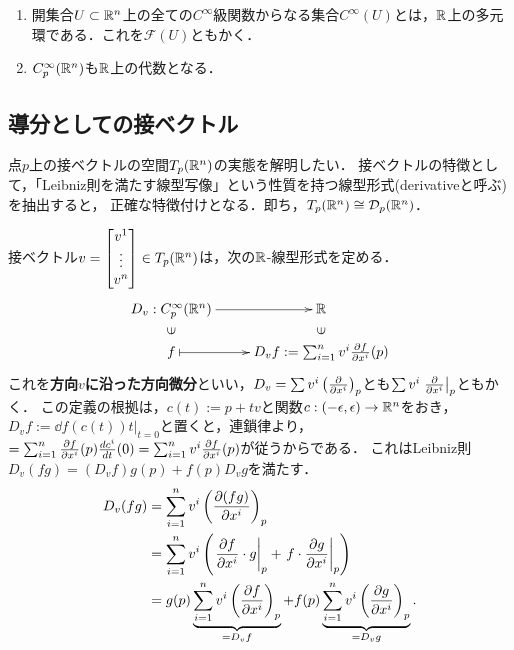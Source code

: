 \documentclass[uplatex,dvipdfmx]{jsreport}
\begin{document}
\begin{example}\mbox{}
    \begin{enumerate}
        \item 開集合$U\subset\mathbb{R}^n$上の全ての$C^\infty$級関数からなる集合$C^\infty(U)$とは，$\mathbb{R}$上の多元環である．これを$\mathcal{F}(U)$ともかく．
        \item $C^\infty_p(\mathbb{R}^n)$も$\mathbb{R}$上の代数となる．
    \end{enumerate}
\end{example}

\subsection{導分としての接ベクトル}

\begin{tcolorbox}[colframe=ForestGreen, colback=ForestGreen!10!white, breakable ,colbacktitle=ForestGreen!40!white, coltitle=black,fonttitle=\bfseries\sffamily,
    title=]
    点$p$上の接ベクトルの空間$T_p(\mathbb{R}^n)$の実態を解明したい．
    接ベクトルの特徴として，「Leibniz則を満たす線型写像」という性質を持つ線型形式(derivativeと呼ぶ)を抽出すると，
    正確な特徴付けとなる．即ち，$T_p(\mathbb{R}^n)\cong\mathcal{D}_p(\mathbb{R}^n)$．
\end{tcolorbox}

\begin{discussion}[方向微分の研究]\label{discussion-tangent-vector-as-differential}
    接ベクトル$v=\begin{bmatrix}v^1\\\vdots\\v^n\end{bmatrix}\in T_p(\mathbb{R}^n)$は，次の$\mathbb{R}$-線型形式を定める．
    \[\xymatrix@R-2pc{
        D_v:C^\infty_p(\R^n)\ar[r]&\R\\
        \rotatebox[origin=c]{90}{$\in$}&\rotatebox[origin=c]{90}{$\in$}\\
        f\ar@{|->}[r]&D_vf:=\sum^n_{i=1}v^i\pp{f}{x^i}(p)
    }\]
    これを\textbf{方向$v$に沿った方向微分}といい，$D_v=\sum v^i\left(\frac{\partial }{\partial x^i}\right)_p$とも$\sum v^i\left.\frac{\partial }{\partial x^i}\right|_p$ともかく．
    この定義の根拠は，$c(t):=p+tv$と関数$c:(-\epsilon,\epsilon)\to\mathbb{R}^n$をおき，$D_vf:=\left.\dd{f(c(t))}{t}\right|_{t=0}$と置くと，連鎖律より，$=\sum^n_{i=1}\frac{\partial f}{\partial x^i}(p)\frac{d c^i}{d t}(0)=\sum^n_{i=1}v^i\frac{\partial f}{\partial x^i}(p)$が従うからである．
    これはLeibniz則$D_v(fg)=(D_vf)g(p)+f(p)D_vg$を満たす．
    \begin{align*}
        D_v(fg)&=\sum^n_{i=1}v^i\left(\frac{\partial (fg)}{\partial x^i}\right)_p\\
        &=\sum^n_{i=1}v^i\left(\left.\frac{\partial f}{\partial x^i}\cdot g\right|_p+\left.f\cdot \frac{\partial g}{\partial x^i}\right|_p\right)\\
        &=g(p)\underbrace{\sum^n_{i=1}v^i\left(\frac{\partial f}{\partial x^i}\right)_p}_{=D_vf}+f(p)\underbrace{\sum^n_{i=1}v^i\left(\frac{\partial g}{\partial x^i}\right)_p}_{=D_vg}.
    \end{align*}
\end{discussion}
\end{document}
